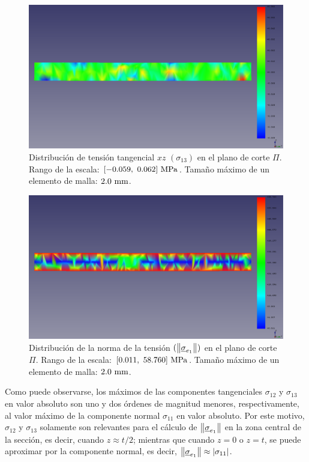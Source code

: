 \begin{figure}[H]
    \centering
    \includegraphics[width=\textwidth]{figures/resultados/stress_vector_z_20.pdf}
    \caption{Distribución de tensión tangencial $xz$ $(\sigma_{13})$ en el plano de corte $\Pi$. Rango de la escala: $[-0.059, \ 0.062] \ \mega\pascal$. Tamaño máximo de un elemento de malla: $2.0 \ \milli\meter$.}
    \label{fig:stress_vector_z_20}
\end{figure}

\begin{figure}[H]
    \centering
    \includegraphics[width=\textwidth]{figures/resultados/stress_vector_magnitude_20.pdf}
    \caption{Distribución de la norma de la tensión $(\norm{\vec{\sigma}_{e_1}})$ en el plano de corte $\Pi$. Rango de la escala: $[0.011, \ 58.760] \ \mega\pascal$. Tamaño máximo de un elemento de malla: $2.0 \ \milli\meter$.}
    \label{fig:stress_vector_magnitude_20}
\end{figure}

Como puede observarse, los máximos de las componentes tangenciales $\sigma_{12}$ y $\sigma_{13}$ en valor absoluto son uno y dos órdenes de magnitud menores, respectivamente, al valor máximo de la componente normal $\sigma_{11}$ en valor absoluto. Por este motivo, $\sigma_{12}$ y $\sigma_{13}$ solamente son relevantes para el cálculo de $\norm{\vec{\sigma}_{e_1}}$ en la zona central de la sección, es decir, cuando $z \approx t / 2$; mientras que cuando $z = 0$ o $z = t$, se puede aproximar por la componente normal, es decir, $\norm{\vec{\sigma}_{e_1}} \approx \abs{\sigma_{11}}$.

